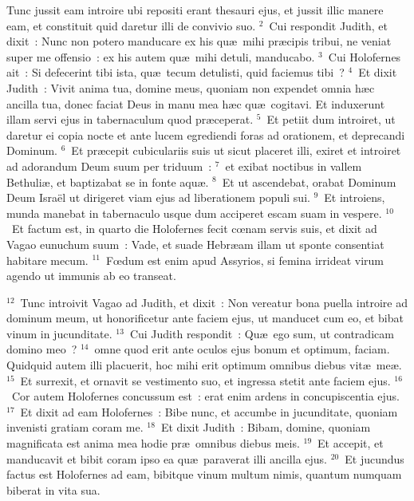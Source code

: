 \bchapter
\lettrine[lines=3,image=true,loversize=0.05,lraise=-0.03]{T}{}unc jussit eam introire ubi repositi erant thesauri ejus, et jussit illic manere eam, et constituit quid daretur illi de convivio suo.
${}^{2}$~Cui respondit Judith, et dixit~: Nunc non potero manducare ex his qu\ae\ mihi pr\ae cipis tribui, ne veniat super me offensio~: ex his autem qu\ae\ mihi detuli, manducabo.
${}^{3}$~Cui Holofernes ait~: Si defecerint tibi ista, qu\ae\ tecum detulisti, quid faciemus tibi~?
${}^{4}$~Et dixit Judith~: Vivit anima tua, domine meus, quoniam non expendet omnia h\ae c ancilla tua, donec faciat Deus in manu mea h\ae c qu\ae\ cogitavi. Et induxerunt illam servi ejus in tabernaculum quod pr\ae ceperat.
${}^{5}$~Et petiit dum introiret, ut daretur ei copia nocte et ante lucem egrediendi foras ad orationem, et deprecandi Dominum.
${}^{6}$~Et pr\ae cepit cubiculariis suis ut sicut placeret illi, exiret et introiret ad adorandum Deum suum per triduum~:
${}^{7}$~et exibat noctibus in vallem Bethuli\ae , et baptizabat se in fonte aqu\ae .
${}^{8}$~Et ut ascendebat, orabat Dominum Deum Isra\"el ut dirigeret viam ejus ad liberationem populi sui.
${}^{9}$~Et introiens, munda manebat in tabernaculo usque dum acciperet escam suam in vespere.
${}^{10}$~Et factum est, in quarto die Holofernes fecit cœnam servis suis, et dixit ad Vagao eunuchum suum~: Vade, et suade Hebr\ae am illam ut sponte consentiat habitare mecum.
${}^{11}$~Fœdum est enim apud Assyrios, si femina irrideat virum agendo ut immunis ab eo transeat.


${}^{12}$~Tunc introivit Vagao ad Judith, et dixit~: Non vereatur bona puella introire ad dominum meum, ut honorificetur ante faciem ejus, ut manducet cum eo, et bibat vinum in jucunditate.
${}^{13}$~Cui Judith respondit~: Qu\ae\ ego sum, ut contradicam domino meo~?
${}^{14}$~omne quod erit ante oculos ejus bonum et optimum, faciam. Quidquid autem illi placuerit, hoc mihi erit optimum omnibus diebus vit\ae\ me\ae .
${}^{15}$~Et surrexit, et ornavit se vestimento suo, et ingressa stetit ante faciem ejus.
${}^{16}$~Cor autem Holofernes concussum est~: erat enim ardens in concupiscentia ejus.
${}^{17}$~Et dixit ad eam Holofernes~: Bibe nunc, et accumbe in jucunditate, quoniam invenisti gratiam coram me.
${}^{18}$~Et dixit Judith~: Bibam, domine, quoniam magnificata est anima mea hodie pr\ae\ omnibus diebus meis.
${}^{19}$~Et accepit, et manducavit et bibit coram ipso ea qu\ae\ paraverat illi ancilla ejus.
${}^{20}$~Et jucundus factus est Holofernes ad eam, bibitque vinum multum nimis, quantum numquam biberat in vita sua.

